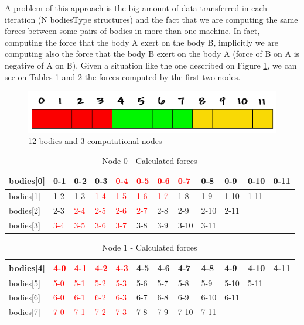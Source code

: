 \documentclass[a4paper]{article}
\begin{document}
A problem of this approach is the big amount of data transferred in each iteration (N bodiesType structures) and the fact that we are computing the same forces between some pairs of bodies in more than one machine. In fact, computing the force that the body A exert on the body B, implicitly we are computing also the force that the body B exert on the body A (force of B on A is negative of A on B). Given a situation like the one described on Figure \ref{fig:nodes}, we can see on Tables \ref{table:t1} and \ref{table:t2} the forces computed by the first two nodes.

\begin{figure}[ht]
  \centering\includegraphics[width=0.6\linewidth]{array_procs_3}
  \caption{12 bodies and 3 computational nodes}
  \label{fig:nodes}
\end{figure}
\FloatBarrier

\begin{table}[]
\centering
\caption{Node 0 - Calculated forces}
\label{table:t1}
\begin{tabular}{l|lllllllllll}
bodies{[}0{]} & 0-1 & 0-2 & 0-3 & \textcolor{red}{0-4} & \textcolor{red}{0-5} & \textcolor{red}{0-6} & \textcolor{red}{0-7}  & 0-8  & 0-9  & 0-10 & 0-11 \\ \hline
bodies{[}1{]} & 1-2 & 1-3 & \textcolor{red}{1-4} & \textcolor{red}{1-5} & \textcolor{red}{1-6} & \textcolor{red}{1-7} & 1-8  & 1-9  & 1-10 & 1-11 &      \\ \hline
bodies{[}2{]} & 2-3 & \textcolor{red}{2-4} & \textcolor{red}{2-5} & \textcolor{red}{2-6} & \textcolor{red}{2-7} & 2-8 & 2-9  & 2-10 & 2-11 &      &      \\ \hline
bodies{[}3{]} & \textcolor{red}{3-4} & \textcolor{red}{3-5} & \textcolor{red}{3-6} & \textcolor{red}{3-7} & 3-8 & 3-9 & 3-10 & 3-11 &      &      &   
\end{tabular}
\end{table}

\begin{table}[]
\centering
\caption{Node 1 - Calculated forces}
\label{table:t2}
\begin{tabular}{l|lllllllllll}
bodies{[}4{]} & \textcolor{red}{4-0} & \textcolor{red}{4-1} & \textcolor{red}{4-2} & \textcolor{red}{4-3} & 4-5 & 4-6 & 4-7  & 4-8  & 4-9  & 4-10 & 4-11 \\ \hline
bodies{[}5{]} & \textcolor{red}{5-0} & \textcolor{red}{5-1} & \textcolor{red}{5-2} & \textcolor{red}{5-3} & 5-6 & 5-7 & 5-8  & 5-9  & 5-10 & 5-11 &      \\ \hline
bodies{[}6{]} & \textcolor{red}{6-0} & \textcolor{red}{6-1} & \textcolor{red}{6-2} & \textcolor{red}{6-3} & 6-7 & 6-8 & 6-9  & 6-10 & 6-11 &      &      \\ \hline
bodies{[}7{]} & \textcolor{red}{7-0} & \textcolor{red}{7-1} & \textcolor{red}{7-2} & \textcolor{red}{7-3} & 7-8 & 7-9 & 7-10 & 7-11 &      &      &     
\end{tabular}
\end{table}
\end{document}
